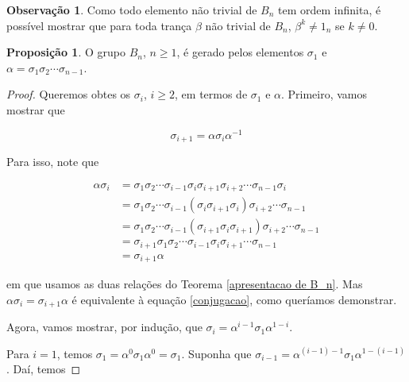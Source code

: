 \documentclass[a4paper,portuguese,11pt,twoside, leqno]{book}
\theoremstyle{definition}
\newtheorem{remark}{Observação}[section]
\newtheorem{prop}{Proposição}[section]
\begin{document}
	\begin{remark}
		Como todo elemento não trivial de $B_n$ tem ordem infinita, é possível mostrar que para toda trança $\beta$ não trivial de $B_n$, $\beta^k\neq 1_n$ se $k\neq 0$.
	\end{remark}
	
	\begin{prop}
		\label{sigma1 e alfa geram B_n}
		O grupo $B_n$, $n\geq 1$, é gerado pelos elementos $\sigma_1$ e $\alpha = \sigma_1\sigma_2\cdots\sigma_{n-1}$.
	\end{prop}
	
	\begin{proof}
		Queremos obtes os $\sigma_i$, $i\geq 2$, em termos de $\sigma_1$ e $\alpha$. Primeiro, vamos mostrar que 
		
		\begin{equation}
		\label{conjugacao}
		\sigma_{i+1} = \alpha\sigma_i\alpha^{-1}
		\end{equation} 
		
		\par\vspace{0.3cm} Para isso, note que 
		
		\begin{align*}
		\alpha\sigma_i &= \sigma_1\sigma_2\cdots\sigma_{i-1}\sigma_i\sigma_{i+1}\sigma_{i+2}\cdots\sigma_{n-1}\sigma_i \\ 
		&=\sigma_1\sigma_2\cdots\sigma_{i-1}(\sigma_{i}\sigma_{i+1}\sigma_i)\sigma_{i+2}\cdots\sigma_{n-1}  \\
		&= \sigma_1\sigma_2\cdots\sigma_{i-1}(\sigma_{i+1}\sigma_i\sigma_{i+1})\sigma_{i+2}\cdots\sigma_{n-1} \\
		&= \sigma_{i+1}\sigma_1\sigma_2\cdots\sigma_{i-1}\sigma_i\sigma_{i+1}\cdots\sigma_{n-1} \\
		&= \sigma_{i+1}\alpha
		\end{align*}
		
		\par\vspace{0.3cm} em que usamos as duas relações do Teorema \eqref{apresentacao de B_n}. Mas $\alpha\sigma_i = \sigma_{i+1}\alpha$ é equivalente à equação \eqref{conjugacao}, como queríamos demonstrar.
		
		\par\vspace{0.3cm} Agora, vamos mostrar, por indução, que $\sigma_i = \alpha^{i-1}\sigma_1\alpha^{1-i}$. 
		
		\par\vspace{0.3cm} Para $i=1$, temos $\sigma_1 = \alpha^0\sigma_1\alpha^0 = \sigma_1$. Suponha que $\sigma_{i-1} = \alpha^{(i-1)-1}\sigma_1\alpha^{1-(i-1)}$. Daí, temos
		

\end{proof}
\end{document}

